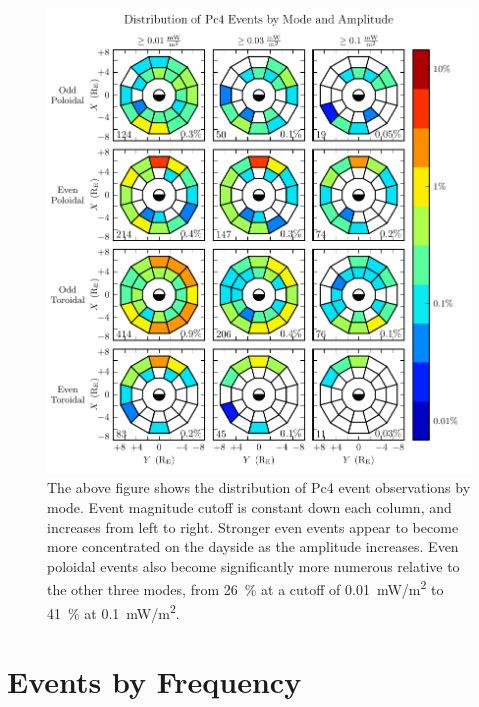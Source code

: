 \begin{figure}[!htb]
    \centering
    \includegraphics[width=\textwidth]{figures/mode_amp.pdf}
    \caption[Observation Rate of Pc4 Events by Mode and Amplitude]{
      The above figure shows the distribution of Pc4 event observations by mode. Event magnitude cutoff is constant down each column, and increases from left to right. Stronger even events appear to become more concentrated on the dayside as the amplitude increases. Even poloidal events also become significantly more numerous relative to the other three modes, from \SI{26}{\percent} at a cutoff of \SI{0.01}{\mW/\m\squared} to \SI{41}{\percent} at \SI{0.1}{\mW/\m\squared}. 
    }
    \label{fig_mode_amp}
\end{figure}

\section{Events by Frequency}
  \label{sec_f}

